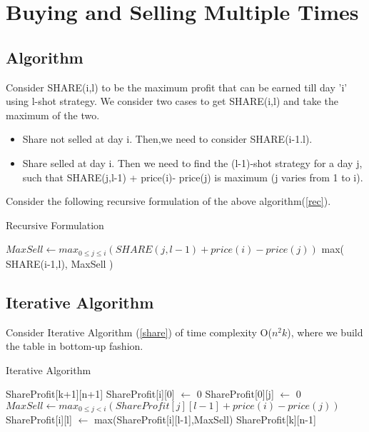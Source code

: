 \documentclass{article}
\begin{document}
\section{Buying and Selling Multiple Times}

\subsection{Algorithm}
Consider SHARE(i,l) to be the maximum profit that can be earned till day 'i' using l-shot strategy. We consider two cases to get SHARE(i,l) and take the maximum of the two.
\begin{itemize}
\item Share not selled at day i. Then,we need to consider SHARE(i-1.l).
\item Share selled at day i. Then we need to find the (l-1)-shot strategy for a day j, such that SHARE(j,l-1) + price(i)- price(j) is maximum (j varies from 1 to i).
\end{itemize}
Consider the following recursive formulation of the above algorithm(\ref{rec}).
\newpage
\begin{algorithm}[h!]
\caption{Recursive Formulation}
\label{rec}
\begin{algorithmic}[1]
\State {}
\EndIf
\State $MaxSell \gets max_{0 \leq j \leq i}( SHARE(j,l-1) + price(i)- price(j) )$  
\State \Return max( SHARE(i-1,l),  MaxSell )
\EndProcedure
\end{algorithmic}
\end{algorithm}

\subsection{Iterative Algorithm}
Consider Iterative Algorithm (\ref{share}) of time complexity O($n^2k$), where we build the table in bottom-up fashion.
\begin{algorithm}[h!]
\caption{Iterative Algorithm}
\label{share}
\begin{algorithmic}[1]
\State ShareProfit[k+1][n+1] 
\State ShareProfit[i][0] $\gets$ 0
\EndFor
{}
\State ShareProfit[0][j] $\gets$ 0
\EndFor
{}
\State $MaxSell \gets max_{0 \leq j<i}( ShareProfit[j][l-1] + price(i)- price(j) )$  
\State ShareProfit[i][l] $\gets$ max(ShareProfit[i][l-1],MaxSell)
\EndFor
\EndFor
\State \Return ShareProfit[k][n-1]
\EndProcedure
\end{algorithmic}
\end{algorithm}
\end{document}
